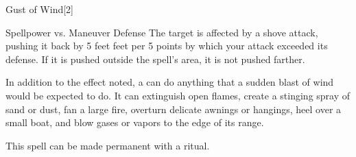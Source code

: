 \begin{spellsection}{Gust of Wind}[2]
    \begin{spellheader}
    \end{spellheader}
    \begin{spellcontent}
        \begin{spelltargetinginfo}
        \end{spelltargetinginfo}
        \begin{spelleffects}
            \begin{spellattack}{Spellpower vs. Maneuver Defense}
                \spellsuccess The target is affected by a shove attack, pushing it back by 5 feet  feet per 5 points by which your attack exceeded its defense. If it is pushed outside the spell's area, it is not pushed farther.
            \end{spellattack}
        \end{spelleffects}
    \end{spellcontent}
    \begin{spellfooter}
        \spellnotes In addition to the effect noted, a  can do anything that a sudden blast of wind would be expected to do. It can extinguish open flames, create a stinging spray of sand or dust, fan a large fire, overturn delicate awnings or hangings, heel over a small boat, and blow gases or vapors to the edge of its range.

        This spell can be made permanent with a  ritual.
        \miscastexplode
    \end{spellfooter}
\end{spellsection}


